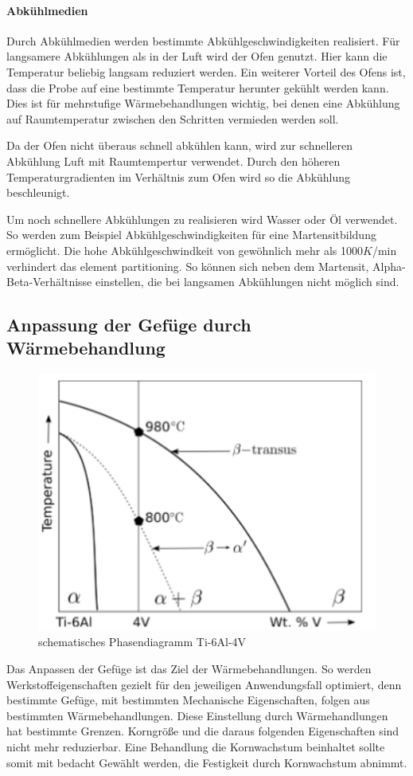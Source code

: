 \documentclass[a4paper, 11pt]{tubsreprt}
\begin{document}
\paragraph{Abkühlmedien}

Durch Abkühlmedien werden bestimmte Abkühlgeschwindigkeiten realisiert. Für langsamere Abkühlungen als in der Luft wird der Ofen genutzt. Hier kann die Temperatur beliebig langsam reduziert werden. Ein weiterer Vorteil des Ofens ist, dass die Probe auf eine bestimmte Temperatur herunter gekühlt werden kann. Dies ist für mehrstufige Wärmebehandlungen wichtig, bei denen eine Abkühlung auf Raumtemperatur zwischen den Schritten vermieden werden soll. 

Da der Ofen nicht überaus schnell abkühlen kann, wird zur schnelleren Abkühlung Luft mit Raumtempertur verwendet. Durch den höheren Temperaturgradienten im Verhältnis zum Ofen wird so die Abkühlung beschleunigt.  

Um noch schnellere Abkühlungen zu realisieren wird Wasser oder Öl verwendet. So werden zum Beispiel Abkühlgeschwindigkeiten für eine Martensitbildung ermöglicht. Die hohe Abkühlgeschwindkeit von gewöhnlich mehr als 1000$K$/min verhindert das element partitioning. So können sich neben dem Martensit, Alpha-Beta-Verhältnisse einstellen, die bei langsamen Abkühlungen nicht möglich sind. 
\subsection{Anpassung der Gefüge durch Wärmebehandlung}
\begin{figure}
	\centering
	\includegraphics[scale=0.9]{Bilder/Phasendiagram.PNG}
	\caption[Phasendiagramm]{schematisches Phasendiagramm Ti-6Al-4V \cite{Babu2008}}
	\label{fig2}
\end{figure}
Das Anpassen der Gefüge ist das Ziel der Wärmebehandlungen. So werden Werkstoffeigenschaften gezielt für den jeweiligen Anwendungsfall optimiert, denn bestimmte Gefüge, mit bestimmten Mechanische Eigenschaften,  folgen aus bestimmten Wärmebehandlungen. Diese Einstellung durch Wärmehandlungen hat bestimmte Grenzen. Korngröße und die daraus folgenden Eigenschaften sind nicht mehr reduzierbar. Eine Behandlung die Kornwachstum beinhaltet sollte somit mit bedacht Gewählt werden, die Festigkeit durch Kornwachstum abnimmt.
\end{document}
